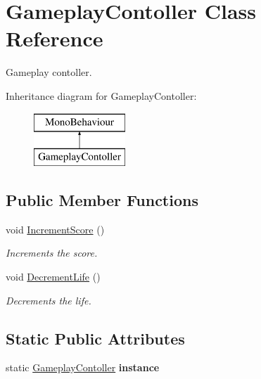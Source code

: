 \hypertarget{class_gameplay_contoller}{}\section{Gameplay\+Contoller Class Reference}
\label{class_gameplay_contoller}


Gameplay contoller.  


Inheritance diagram for Gameplay\+Contoller\+:\begin{figure}[H]
\begin{center}
\leavevmode
\includegraphics[height=2.000000cm]{class_gameplay_contoller}
\end{center}
\end{figure}
\subsection*{Public Member Functions}
\begin{DoxyCompactItemize}
\item 
void \hyperlink{class_gameplay_contoller_adfd4f2fbd55f084a0f1c5ddc2f5f3af6}{Increment\+Score} ()
\begin{DoxyCompactList}\small\item\em Increments the score. \end{DoxyCompactList}\item 
void \hyperlink{class_gameplay_contoller_a1de279d81704fd5035097275cb2d9519}{Decrement\+Life} ()
\begin{DoxyCompactList}\small\item\em Decrements the life. \end{DoxyCompactList}\end{DoxyCompactItemize}
\subsection*{Static Public Attributes}
\begin{DoxyCompactItemize}
\item 
\mbox{\label{class_gameplay_contoller_ac5c3e93b39c20d0ea8cb59a994019fc7}} 
static \hyperlink{class_gameplay_contoller}{Gameplay\+Contoller} {\bfseries instance}
\end{DoxyCompactItemize}


